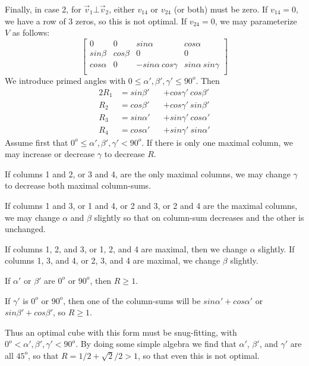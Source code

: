 Finally, in case 2, for $\vec{v}_1 \bot \vec{v}_2$, either $v_{14}$ or
$v_{24}$ (or both) must be zero.  If $v_{14} = 0$, we have a row of 3 zeros,
so this is not optimal.  If $v_{24} = 0$, we may parameterize $V$ as follows:
\begin{equation*}
\left[
\begin{array}{cccc}
   0      &    0     &  sin\alpha           &  cos\alpha           \\
sin\beta  & cos\beta &           0          &           0          \\
cos\alpha &    0     & -sin\alpha~cos\gamma &  sin\alpha~sin\gamma \\
\end{array}
\right]
\end{equation*}
We introduce primed angles with $0 \leq \alpha',\beta',\gamma' \leq 90^o$.
Then
\begin{alignat*}{2}
R_1 &= sin\beta'  &&+ cos\gamma'~cos\beta'  \\
R_2 &= cos\beta'  &&+ cos\gamma'~sin\beta'  \\
R_3 &= sin\alpha' &&+ sin\gamma'~cos\alpha' \\
R_4 &= cos\alpha' &&+ sin\gamma'~sin\alpha'
\end{alignat*}
Assume first that $0^o \leq \alpha',\beta',\gamma' < 90^o$.  If there is only
one maximal column, we may increase or decrease $\gamma$ to decrease $R$.

If columns 1 and 2, or 3 and 4, are the only maximal columns, we may change
$\gamma$ to decrease both maximal column-sums.

If columns 1 and 3, or 1 and 4, or 2 and 3, or 2 and 4 are the maximal
columns, we may change $\alpha$ and $\beta$ slightly so that on column-sum
decreases and the other is unchanged.

If columns 1, 2, and 3, or 1, 2, and 4 are maximal, then we change $\alpha$
slightly. If columns 1, 3, and 4, or 2, 3, and 4 are maximal, we change
$\beta$ slightly.

If $\alpha'$ or $\beta'$ are $0^o$ or $90^o$, then $R \geq 1$.

If $\gamma'$ is $0^o$ or $90^o$, then one of the column-sums will be
$sin\alpha' + cos\alpha'$ or $sin\beta' + cos\beta'$, so $R \geq 1$.

Thus an optimal cube with this form must be snug-fitting, with $0^o <
\alpha',\beta',\gamma' < 90^o$.  By doing some simple algebra we find that
$\alpha'$, $\beta'$, and $\gamma'$ are all $45^o$, so that $R = 1/2 +
\sqrt{2}/2 > 1$, so that even this is not optimal.

